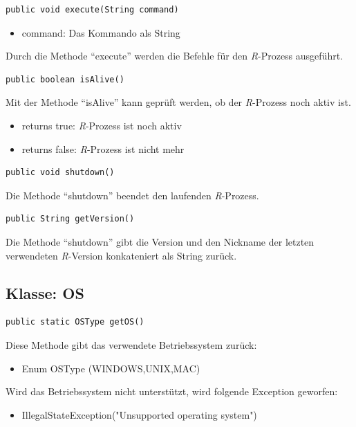 \documentclass[a4paper, 12pt]{report} %
\begin{document}
\lstset{language=Java}
\begin{lstlisting}[frame=single]
public void execute(String command)
\end{lstlisting}
\begin{itemize}
	\item command: Das Kommando als String
\end{itemize}

Durch die Methode "`execute"' werden die Befehle für den \textit{R}-Prozess ausgeführt.
%
\lstset{language=Java}
\begin{lstlisting}[frame=single]
public boolean isAlive()
\end{lstlisting}
%
Mit der Methode "`isAlive"'  kann geprüft werden, ob der \textit{R}-Prozess noch aktiv ist.
\begin{itemize}
	\item returns true: \textit{R}-Prozess ist noch aktiv
	\item returns false: \textit{R}-Prozess ist nicht mehr 
\end{itemize}


\lstset{language=Java}
\begin{lstlisting}[frame=single]
public void shutdown()
\end{lstlisting}
%
Die Methode "`shutdown"' beendet den laufenden \textit{R}-Prozess.\\

\lstset{language=Java}
\begin{lstlisting}[frame=single]
public String getVersion()
\end{lstlisting}
%
Die Methode "`shutdown"' gibt die Version und den Nickname der letzten verwendeten \textit{R}-Version konkateniert als String zurück.

\subsection{Klasse: OS}

\lstset{language=Java}
\begin{lstlisting}[frame=single]
public static OSType getOS()
\end{lstlisting}
Diese Methode gibt das verwendete Betriebssystem zurück:
\begin{itemize}
	\item Enum OSType (WINDOWS,UNIX,MAC)
\end{itemize} 
Wird das Betriebssystem nicht unterstützt, wird folgende Exception geworfen:
\begin{itemize}
	\item IllegalStateException("{}Unsupported operating system"{})
\end{itemize}
\end{document}
